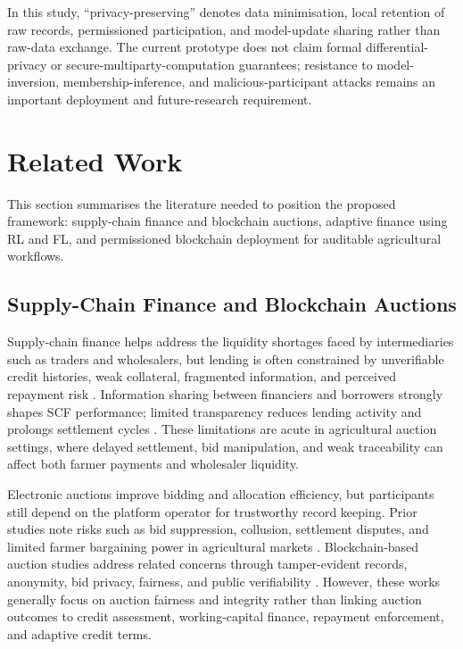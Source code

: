 \documentclass[12pt]{article}
\begin{document}
In this study, ``privacy-preserving'' denotes data minimisation, local retention of raw records, permissioned participation, and model-update sharing rather than raw-data exchange. The current prototype does not claim formal differential-privacy or secure-multiparty-computation guarantees; resistance to model-inversion, membership-inference, and malicious-participant attacks remains an important deployment and future-research requirement.
	
	
	
	
	
	
\section{Related Work}

This section summarises the literature needed to position the proposed framework: supply-chain finance and blockchain auctions, adaptive finance using RL and FL, and permissioned blockchain deployment for auditable agricultural workflows.

\subsection{Supply-Chain Finance and Blockchain Auctions}

Supply-chain finance helps address the liquidity shortages faced by intermediaries such as traders and wholesalers, but lending is often constrained by unverifiable credit histories, weak collateral, fragmented information, and perceived repayment risk \citep{stiglitz_credit_1981,rajan_covenants_1995,caniato_supply_2019}. Information sharing between financiers and borrowers strongly shapes SCF performance; limited transparency reduces lending activity and prolongs settlement cycles \citep{moretto_can_2021}. These limitations are acute in agricultural auction settings, where delayed settlement, bid manipulation, and weak traceability can affect both farmer payments and wholesaler liquidity.

Electronic auctions improve bidding and allocation efficiency, but participants still depend on the platform operator for trustworthy record keeping. Prior studies note risks such as bid suppression, collusion, settlement disputes, and limited farmer bargaining power in agricultural markets \citep{reddy_electronic_2019}. Blockchain-based auction studies address related concerns through tamper-evident records, anonymity, bid privacy, fairness, and public verifiability \citep{ye_anonymous_2023,zhang_blockchain-based_2024,liu_when_2024}. However, these works generally focus on auction fairness and integrity rather than linking auction outcomes to credit assessment, working-capital finance, repayment enforcement, and adaptive credit terms.
\end{document}
